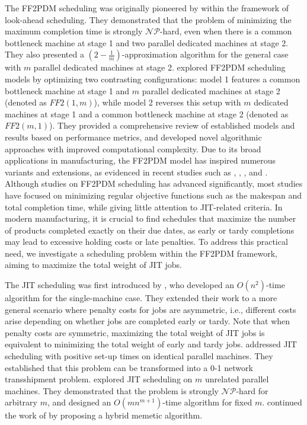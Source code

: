 \documentclass[12pt, eqno, limlimits]{article}
\begin{document}
\begin{sloppypar}
        The FF2PDM scheduling was originally pioneered by \cite{HerrmannLee1992} within the framework of look-ahead scheduling. They demonstrated that the problem of minimizing the maximum completion time is strongly $\mathcal{NP}$-hard, even when there is a common bottleneck machine at stage 1 and two parallel dedicated machines at stage 2. They also presented a $(2-\frac{1}{m})$-approximation algorithm for the general case with $m$ parallel dedicated machines at stage 2. \cite{HwangLin2018COR} explored FF2PDM scheduling models by optimizing two contrasting configurations: model 1 features a common bottleneck machine at stage 1 and $m$ parallel dedicated machines at stage 2 (denoted as $FF2(1, m)$), while model 2 reverses this setup with $m$ dedicated machines at stage 1 and a common bottleneck machine at stage 2 (denoted as $FF2(m, 1)$). They provided a comprehensive review of established models and results based on performance metrics, and developed novel algorithmic approaches with improved computational complexity. Due to its broad applications in manufacturing, the FF2PDM model has inspired numerous variants and extensions, as evidenced in recent studies such as \cite{ZhengHeYang2023COR}, \cite{HajjiHamlaoui2024AIME}, \cite{AgnetisMosheiov2025OPTL}, and \cite{ZhaoChenAn2025CIE}. Although studies on FF2PDM scheduling has advanced significantly, most studies have focused on minimizing regular objective functions such as the makespan and total completion time, while giving little attention to JIT-related criteria. In modern manufacturing, it is crucial to find schedules that maximize the number of products completed exactly on their due dates, as early or tardy completions may lead to excessive holding costs or late penalties. To address this practical need, we investigate a scheduling problem within the FF2PDM framework, aiming to maximize the total weight of JIT jobs.
        
        The JIT scheduling was first introduced by \cite{LannMosheiov1996COR}, who developed an $O(n^2)$-time algorithm for the single-machine case. They extended their work to a more general scenario where penalty costs for jobs are asymmetric, i.e., different costs arise depending on whether jobs are completed early or tardy. Note that when penalty costs are symmetric, maximizing the total weight of JIT jobs is equivalent to minimizing the total weight of early and tardy jobs.  \cite{HiraishiLevner2002COR} addressed JIT scheduling with positive set-up times on identical parallel machines. They established that this problem can be transformed into a 0-1 network transshipment problem. \cite{SungVlach2005JOS} explored JIT scheduling on $m$ unrelated parallel machines. They demonstrated that the problem is strongly $\mathcal{NP}$-hard for arbitrary $m$, and designed an $O(mn^{m+1})$-time algorithm for fixed $m$. \cite{JolaiAmalnick2011JIM} continued the work of \cite{SungVlach2005JOS} by proposing a hybrid memetic algorithm.
        

\end{sloppypar}
\end{document}
